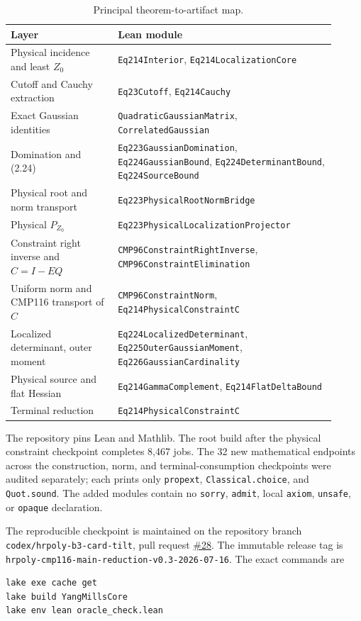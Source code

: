 \documentclass[11pt,a4paper]{article}
\theoremstyle{definition}
\newcommand{\lean}[1]{\texttt{#1}}
\begin{document}
\begin{table}[ht]
\centering
\small
\begin{tabular}{p{0.30\linewidth}p{0.61\linewidth}}
\toprule
Layer & Lean module \\
\midrule
Physical incidence and least $Z_0$ &
\lean{Eq214Interior},
\lean{Eq214LocalizationCore} \\
Cutoff and Cauchy extraction &
\lean{Eq23Cutoff},
\lean{Eq214Cauchy} \\
Exact Gaussian identities &
\lean{QuadraticGaussianMatrix},
\lean{CorrelatedGaussian} \\
Domination and (2.24) &
\lean{Eq223GaussianDomination},
\lean{Eq224GaussianBound},
\lean{Eq224DeterminantBound},
\lean{Eq224SourceBound} \\
Physical root and norm transport &
\lean{Eq223PhysicalRootNormBridge} \\
Physical $P_{Z_0}$ &
\lean{Eq223PhysicalLocalizationProjector} \\
Constraint right inverse and $C=I-EQ$ &
\lean{CMP96ConstraintRightInverse},
\lean{CMP96ConstraintElimination} \\
Uniform norm and CMP116 transport of $C$ &
\lean{CMP96ConstraintNorm},
\lean{Eq214PhysicalConstraintC} \\
Localized determinant, outer moment &
\lean{Eq224LocalizedDeterminant},
\lean{Eq225OuterGaussianMoment},
\lean{Eq226GaussianCardinality} \\
Physical source and flat Hessian &
\lean{Eq214GammaComplement},
\lean{Eq214FlatDeltaBound} \\
Terminal reduction &
\lean{Eq214PhysicalConstraintC} \\
\bottomrule
\end{tabular}
\caption{Principal theorem-to-artifact map.}
\label{tab:map}
\end{table}

The repository pins Lean and Mathlib.  The root build after the physical
constraint checkpoint completes 8,467 jobs.  The 32 new mathematical
endpoints across the construction, norm, and terminal-consumption checkpoints
were audited separately; each prints only \lean{propext},
\lean{Classical.choice}, and \lean{Quot.sound}.  The added modules contain no
\lean{sorry}, \lean{admit}, local \lean{axiom}, \lean{unsafe}, or
\lean{opaque} declaration.

The reproducible checkpoint is maintained on the repository branch
\lean{codex/hrpoly-b3-card-tilt}, pull request
\href{https://github.com/lluiseriksson/THE-ERIKSSON-PROGRAMME/pull/28}{\#28}.
The immutable release tag is
\lean{hrpoly-cmp116-main-reduction-v0.3-2026-07-16}.  The exact commands are
\begin{verbatim}
lake exe cache get
lake build YangMillsCore
lake env lean oracle_check.lean
\end{verbatim}
\end{document}
